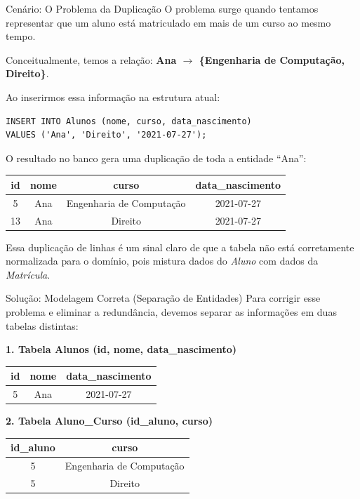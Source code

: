 \documentclass[12pt]{article}
\begin{document}
\begin{block}{Cenário: O Problema da Duplicação}
O problema surge quando tentamos representar que um aluno está matriculado em mais de um curso ao mesmo tempo. 

Conceitualmente, temos a relação: \textbf{Ana $\rightarrow$ \{Engenharia de Computação, Direito\}}.

Ao inserirmos essa informação na estrutura atual:
\begin{lstlisting}
INSERT INTO Alunos (nome, curso, data_nascimento)
VALUES ('Ana', 'Direito', '2021-07-27');
\end{lstlisting}

O resultado no banco gera uma duplicação de toda a entidade ``Ana'':

\begin{center}
{\tiny
\renewcommand{\arraystretch}{1.2}
\begin{longtable}{cccc}
\toprule
\textbf{id} & \textbf{nome} & \textbf{curso} & \textbf{data\_nascimento} \\
\midrule
5  & Ana  & Engenharia de Computação & 2021-07-27 \\
13 & Ana  & Direito                  & 2021-07-27 \\
\bottomrule
\end{longtable}
}
\end{center}

Essa duplicação de linhas é um sinal claro de que a tabela não está corretamente normalizada para o domínio, pois mistura dados do \textit{Aluno} com dados da \textit{Matrícula}.
\end{block}

\begin{block}{Solução: Modelagem Correta (Separação de Entidades)}
Para corrigir esse problema e eliminar a redundância, devemos separar as informações em duas tabelas distintas:

\textbf{1. Tabela Alunos (id, nome, data\_nascimento)}
\begin{center}
{\tiny
\begin{tabular}{|c|c|c|}
\hline
\textbf{id} & \textbf{nome} & \textbf{data\_nascimento} \\ \hline
5 & Ana & 2021-07-27 \\ \hline
\end{tabular}
}
\end{center}

\textbf{2. Tabela Aluno\_Curso (id\_aluno, curso)}
\begin{center}
{\tiny
\begin{tabular}{|c|c|}
\hline
\textbf{id\_aluno} & \textbf{curso} \\ \hline
5 & Engenharia de Computação \\ \hline
5 & Direito \\ \hline
\end{tabular}
}
\end{center}
\end{block}
\end{document}
